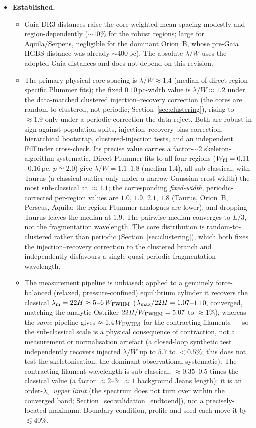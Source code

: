 \documentclass[usenatbib,twoside,twocolumn]{mnras}
\begin{document}
\begin{itemize}
    \item \textbf{Established.}
    \begin{itemize}
        \item Gaia DR3 distances raise the core-weighted mean spacing modestly and region-dependently ($\sim10\%$ for the robust regions; large for Aquila/Serpens, negligible for the dominant Orion~B, whose pre-Gaia HGBS distance was already $\sim400$\,pc). The absolute $\lambda/W$ uses the adopted Gaia distances and does not depend on this revision.
        \item The primary physical core spacing is $\lambda/W\approx1.4$ (median of direct region-specific Plummer fits); the fixed $0.10$\,pc-width value is $\lambda/W\approx1.2$ under the data-matched clustered injection--recovery correction (the cores are random-to-clustered, not periodic; Section~\ref{sec:clustering}), rising to $\approx1.9$ only under a periodic correction the data reject. Both are robust in sign against population splits, injection--recovery bias correction, hierarchical bootstrap, clustered-injection tests, and an independent FilFinder cross-check. Its precise value carries a factor-$\sim$2 skeleton-algorithm systematic. Direct Plummer fits to all four regions ($W_{\rm fil}=0.11$--$0.16$\,pc, $p\simeq2.0$) give $\lambda/W=1.1$--$1.8$ (median $1.4$), all sub-classical, with Taurus (a classical outlier only under a narrow Gaussian-crest width) the most sub-classical at $\approx1.1$; the corresponding \emph{fixed-width}, periodic-corrected per-region values are $1.0$, $1.9$, $2.1$, $1.8$ (Taurus, Orion~B, Perseus, Aquila; the region-Plummer analogues are lower), and dropping Taurus leaves the median at $1.9$. The pairwise median converges to $L/3$, not the fragmentation wavelength. The core distribution is random-to-clustered rather than periodic (Section~\ref{sec:clustering}), which both fixes the injection--recovery correction to the clustered branch and independently disfavours a single quasi-periodic fragmentation wavelength.
        \item The measurement pipeline is unbiased: applied to a genuinely force-balanced (relaxed, pressure-confined) equilibrium cylinder it recovers the classical $\lambda_{\rm m}=22H\approx5$--$6\,W_{\rm FWHM}$ ($\lambda_{\rm max}/22H=1.07$--$1.10$, converged, matching the analytic Ostriker $22H/W_{\rm FWHM}=5.07$ to $\approx1\%$), whereas the \emph{same} pipeline gives $\approx1.4\,W_{\rm FWHM}$ for the contracting filaments --- so the sub-classical scale is a physical consequence of contraction, not a measurement or normalisation artefact (a closed-loop synthetic test independently recovers injected $\lambda/W$ up to $5.7$ to $<0.5\%$; this does not test the skeletonisation, the dominant observational systematic). The contracting-filament wavelength is sub-classical, $\approx0.35$--$0.5$ times the classical value (a factor $\approx2$--$3$; $\approx1$ background Jeans length): it is an order-$\lambda_{\rm J}$ \emph{upper limit} (the spectrum does not turn over within the converged band; Section~\ref{sec:validation_endtoend}), not a precisely-located maximum. Boundary condition, profile and seed each move it by $\lesssim40\%$.

\end{itemize}
\end{itemize}
\end{document}
